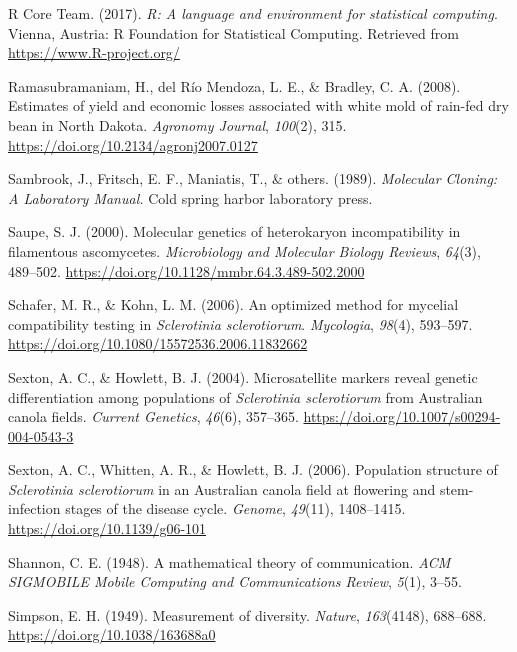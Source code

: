 \hypertarget{ref-R}{}
R Core Team. (2017). \emph{R: A language and environment for statistical
computing}. Vienna, Austria: R Foundation for Statistical Computing.
Retrieved from \url{https://www.R-project.org/}

\hypertarget{ref-ramasubramaniam2008estimates}{}
Ramasubramaniam, H., del Río Mendoza, L. E., \& Bradley, C. A. (2008).
Estimates of yield and economic losses associated with white mold of
rain-fed dry bean in North Dakota. \emph{Agronomy Journal},
\emph{100}(2), 315. \url{https://doi.org/10.2134/agronj2007.0127}

\hypertarget{ref-sambrook1989molecular}{}
Sambrook, J., Fritsch, E. F., Maniatis, T., \& others. (1989).
\emph{Molecular Cloning: A Laboratory Manual.} Cold spring harbor
laboratory press.

\hypertarget{ref-saupe2000molecular}{}
Saupe, S. J. (2000). Molecular genetics of heterokaryon incompatibility
in filamentous ascomycetes. \emph{Microbiology and Molecular Biology
Reviews}, \emph{64}(3), 489--502.
\url{https://doi.org/10.1128/mmbr.64.3.489-502.2000}

\hypertarget{ref-schafer2006optimized}{}
Schafer, M. R., \& Kohn, L. M. (2006). An optimized method for mycelial
compatibility testing in \emph{Sclerotinia sclerotiorum}.
\emph{Mycologia}, \emph{98}(4), 593--597.
\url{https://doi.org/10.1080/15572536.2006.11832662}

\hypertarget{ref-sexton2004microsatellite}{}
Sexton, A. C., \& Howlett, B. J. (2004). Microsatellite markers reveal
genetic differentiation among populations of \emph{Sclerotinia
sclerotiorum} from Australian canola fields. \emph{Current Genetics},
\emph{46}(6), 357--365. \url{https://doi.org/10.1007/s00294-004-0543-3}

\hypertarget{ref-sexton2006population}{}
Sexton, A. C., Whitten, A. R., \& Howlett, B. J. (2006). Population
structure of \emph{Sclerotinia sclerotiorum} in an Australian canola
field at flowering and stem-infection stages of the disease cycle.
\emph{Genome}, \emph{49}(11), 1408--1415.
\url{https://doi.org/10.1139/g06-101}

\hypertarget{ref-shannon2001mathematical}{}
Shannon, C. E. (1948). A mathematical theory of communication. \emph{ACM
SIGMOBILE Mobile Computing and Communications Review}, \emph{5}(1),
3--55.

\hypertarget{ref-simpson1949measurement}{}
Simpson, E. H. (1949). Measurement of diversity. \emph{Nature},
\emph{163}(4148), 688--688. \url{https://doi.org/10.1038/163688a0}


